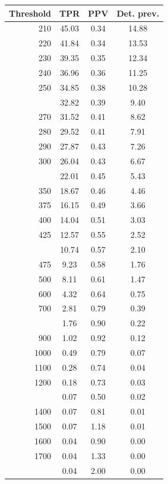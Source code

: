\documentclass[12pt]{article}
\begin{document}
\begin{minipage}{0.5\textwidth}\small
\begin{tabular}{rccc}
\toprule
\textbf{Threshold} & \textbf{TPR} 
& \textbf{PPV} & \textbf{Det. prev.} \\
\midrule 
   210 & 45.03 & 0.34 & 14.88 \\ 
    220 & 41.84 & 0.34 & 13.53 \\ 
    230 & 39.35 & 0.35 & 12.34 \\ 
    240 & 36.96 & 0.36 & 11.25 \\ 
    250 & 34.85 & 0.38 & 10.28 \\  \addlinespace
    260 & 32.82 & 0.39 & 9.40 \\ 
    270 & 31.52 & 0.41 & 8.62 \\ 
    280 & 29.52 & 0.41 & 7.91 \\ 
    290 & 27.87 & 0.43 & 7.26 \\ 
    300 & 26.04 & 0.43 & 6.67 \\  \addlinespace
    325 & 22.01 & 0.45 & 5.43 \\ 
    350 & 18.67 & 0.46 & 4.46 \\ 
    375 & 16.15 & 0.49 & 3.66 \\ 
    400 & 14.04 & 0.51 & 3.03 \\ 
    425 & 12.57 & 0.55 & 2.52 \\  \addlinespace
    450 & 10.74 & 0.57 & 2.10 \\ 
    475 & 9.23 & 0.58 & 1.76 \\ 
    500 & 8.11 & 0.61 & 1.47 \\ 
    600 & 4.32 & 0.64 & 0.75 \\ 
    700 & 2.81 & 0.79 & 0.39 \\  \addlinespace
    800 & 1.76 & 0.90 & 0.22 \\ 
    900 & 1.02 & 0.92 & 0.12 \\ 
   1000 & 0.49 & 0.79 & 0.07 \\ 
   1100 & 0.28 & 0.74 & 0.04 \\ 
   1200 & 0.18 & 0.73 & 0.03 \\  \addlinespace
   1300 & 0.07 & 0.50 & 0.02 \\ 
   1400 & 0.07 & 0.81 & 0.01 \\ 
   1500 & 0.07 & 1.18 & 0.01 \\ 
   1600 & 0.04 & 0.90 & 0.00 \\ 
   1700 & 0.04 & 1.33 & 0.00 \\  \addlinespace
   1800 & 0.04 & 2.00 & 0.00 \\ 

\end{tabular}
\end{minipage}
\end{document}
